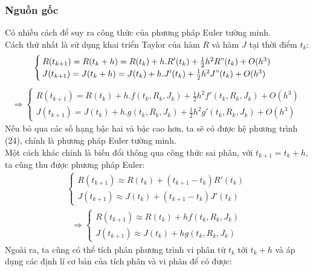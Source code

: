 \subsubsection{Nguồn gốc}
\hspace*{0.5cm} {Có nhiều cách để suy ra công thức của phương pháp Euler tường minh.}\\
\hspace*{0.5cm} {Cách thứ nhất là sử dụng khai triển Taylor của hàm $R$ và hàm $J$ tại thời điểm $t_k$:}
\begin{align}
    \begin{cases}
        R(t_{k+1}) = R(t_k + h) = R(t_k) + h.R'(t_k) + \frac{1}{2}h^2R"(t_k) + O(h^3)\\
        J(t_{k+1}) = J(t_k + h) = J(t_k) + h.J'(t_k) + \frac{1}{2}h^2J"(t_k) + O(h^3)
    \end{cases}
\end{align}
\begin{align}
    \Rightarrow
    \begin{cases}
        R(t_{k+1}) = R(t_k) + h.f(t_k, R_k, J_k) + \frac{1}{2}h^2f'(t_k, R_k, J_k) + O(h^3)\\
        J(t_{k+1}) = J(t_k) + h.g(t_k, R_k, J_k) + \frac{1}{2}h^2g'(t_k, R_k, J_k) + O(h^3)
    \end{cases}
\end{align}
\hspace*{0.5cm} {Nếu bỏ qua các số hạng bậc hai và bậc cao hơn, ta sẽ có được hệ phương trình (24), chính là phương pháp Euler tường minh.}\\
\hspace*{0.5cm} {Một cách khác chính là biến đổi thông qua công thức sai phân, với $t_{k+1} = t_k + h$, ta cũng thu được phương pháp Euler:}
\begin{align}
    \begin{cases}
        R(t_{k+1}) \approx R(t_k) + (t_{k+1} - t_k)R'(t_k)\\
        J(t_{k+1}) \approx J(t_k) + (t_{k+1} - t_k)J'(t_k)
    \end{cases}
\end{align}
\begin{align}
    \Rightarrow
    \begin{cases}
        R(t_{k+1}) \approx R(t_k) + hf(t_k, R_k, J_k)\\
        J(t_{k+1}) \approx J(t_k) + hg(t_k, R_k, J_k)
    \end{cases}
\end{align}
\hspace*{0.5cm} {Ngoài ra, ta cũng có thể tích phân phương trình vi phân từ $t_k$ tới $t_k + h$ và áp dụng các định lí cơ bản của tích phân và vi phân để có được:}\\
